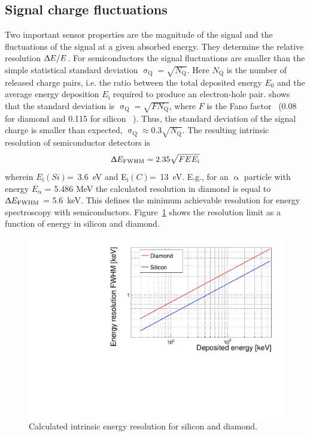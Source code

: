 \subsection{Signal charge fluctuations}
Two important sensor properties are the magnitude of the signal and the fluctuations of the signal at a given absorbed energy. They determine the relative resolution $\Updelta E/E$. For semiconductors the signal fluctuations are smaller than the simple statistical standard deviation $\upsigma_\mathrm{Q}=\sqrt{N_\mathrm{Q}}$. Here $N_\mathrm{Q}$ is the number of released charge pairs, i.e. the ratio between the total deposited energy $E_\mathrm{0}$ and the average energy deposition $E_\mathrm{i}$ required to produce an electron-hole pair. \cite{} shows that the standard deviation is $\upsigma_\mathrm{Q}=\sqrt{F N_\mathrm{Q}}$, where $F$ is the Fano factor~\cite{} (0.08 for diamond and 0.115 for silicon ~\cite{}). Thus, the standard deviation of the signal charge is smaller than expected, $\upsigma_\mathrm{Q}\approx0.3 \sqrt{N_\mathrm{Q}}$. The resulting intrinsic resolution of semiconductor detectors is 
\begin{equation}
\label{eq:efwhm}
\Updelta E_\mathrm{FWHM} = 2.35 \sqrt{FEE_\mathrm{i}} 
\end{equation} 
wherein $E_\mathrm{i}(Si)$=~3.6~eV and E$_\mathrm{i}(C)$=~13~eV. E.g., for an $\upalpha$ particle with energy $E_\upalpha$ = 5.486 MeV the calculated resolution in diamond is equal to $\Updelta E_{\mathrm{FWHM}}$ = 5.6~keV. This defines the minimum achievable resolution for energy spectroscopy with semiconductors. Figure~\ref{fig:enerres} shows the resolution limit as a function of energy in silicon and diamond.

\begin{figure}[!t]
\begin{center}
\includegraphics[width=0.8\linewidth]{../scripts/02_pulse_formation/plots/resolution}
\caption{Calculated intrinsic energy resolution for silicon and diamond.}
\label{fig:enerres}
\end{center}
\end{figure}




